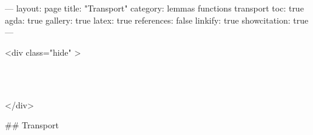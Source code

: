 
---
layout: page
title: "Transport"
category: lemmas functions transport
toc: true
agda: true
gallery: true
latex: true
references: false
linkify: true
showcitation: true
---

<div class="hide" >
\begin{code}%
\>[0]\AgdaSymbol{\{-\#}\AgdaSpace{}%
\AgdaSpace{}%
\AgdaSpace{}%
\AgdaSymbol{\#-\}}\<%
\\
\>[0]\AgdaSpace{}%
\AgdaSpace{}%
\AgdaSpace{}%
\<%
\\
\>[0]\AgdaSpace{}%
\AgdaSpace{}%
\AgdaSpace{}%
\<%
\end{code}
</div>

## Transport

